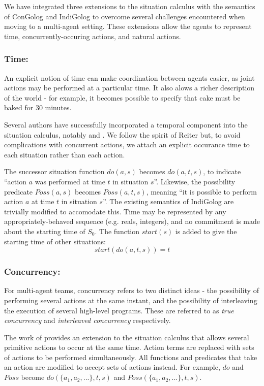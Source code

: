 \documentclass[letterpaper]{article}
\begin{document}
We have integrated three extensions to the situation calculus with the
semantics of ConGolog and IndiGolog to overcome several
challenges encountered when moving to a multi-agent setting.  These
extensions allow the agents to represent time, concurrently-occuring actions,
and natural actions.

\subsubsection{Time:}
An explicit notion of time can make coordination between agents
easier, as joint actions may be performed at a particular time.  It
also alows a richer description of the world - for example, it becomes possible
to specify that cake must be baked for 30 minutes.

Several authors have successfully incorporated a temporal component
into the situation calculus, notably \cite{pinto94temporal} and
\cite{reiter96sc_nat_conc}.  We follow the spirit of Reiter but, to
avoid complications with concurrent actions, we attach an explicit 
occurance time to each situation rather than each action.

The successor situation function $do(a,s)$
becomes $do(a,t,s)$, to indicate ``action $a$ was performed at
time $t$ in situation $s$''. Likewise, the possibility predicate
$Poss(a,s)$ becomes $Poss(a,t,s)$, meaning ``it is possible to
perform action $a$ at time $t$ in situation $s$''.  The existing semantics
of IndiGolog are trivially modified to accomodate this.
Time may be represented by any appropriately-behaved sequence (e.g. reals,
integers), and no commitment is made about the starting time of $S_0$.
The function $start(s)$ is added to give the starting time of other situations:
\begin{equation}
\label{eqn:sit_start}
start(do(a,t,s))=t
\end{equation}

\subsubsection{Concurrency:} 
For multi-agent teams, concurrency refers to two distinct ideas -
the possibility of performing several actions at the same instant,
and the possibility of interleaving the execution of several high-level
programs. These are referred to as \emph{true concurrency} and \emph{interleaved
concurrency} respectively.

The work of \cite{lin92sc_conc,reiter96sc_nat_conc} provides an extension
to the situation calculus that allows several primitive actions to
occur at the same time. Action terms are replaced with sets of actions
to be performed simultaneously. All functions and predicates that
take an action are modified to accept sets of actions instead. For
example, $do$ and $Poss$ become $do(\{ a_{1},a_{2},...\},t,s)$
and $Poss(\{ a_{1},a_{2},...\},t,s)$.
\end{document}
